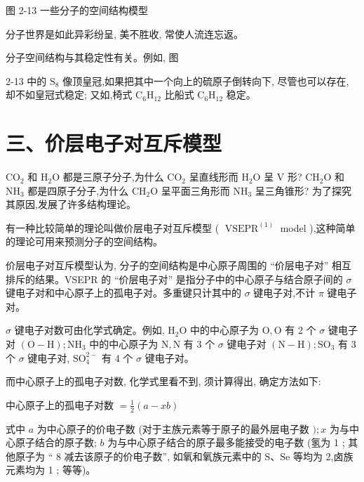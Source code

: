 \documentclass[10pt]{article}
\begin{document}
图 2-13 一些分子的空间结构模型

分子世界是如此异彩纷呈, 美不胜收, 常使人流连忘返。

分子空间结构与其稳定性有关。例如, 图

2-13 中的 \({\mathrm{S}}_{8}\) 像顶皇冠,如果把其中一个向上的硫原子倒转向下, 尽管也可以存在, 却不如皇冠式稳定; 又如,椅式 \({\mathrm{C}}_{6}{\mathrm{H}}_{12}\) 比船式 \({\mathrm{C}}_{6}{\mathrm{H}}_{12}\) 稳定。

\section*{三、价层电子对互斥模型}

\({\mathrm{{CO}}}_{2}\) 和 \({\mathrm{H}}_{2}\mathrm{O}\) 都是三原子分子,为什么 \({\mathrm{{CO}}}_{2}\) 呈直线形而 \({\mathrm{H}}_{2}\mathrm{O}\) 呈 \(\mathrm{V}\) 形? \({\mathrm{{CH}}}_{2}\mathrm{O}\) 和 \({\mathrm{{NH}}}_{3}\) 都是四原子分子,为什么 \({\mathrm{{CH}}}_{2}\mathrm{O}\) 呈平面三角形而 \({\mathrm{{NH}}}_{3}\) 呈三角锥形? 为了探究其原因,发展了许多结构理论。

有一种比较简单的理论叫做价层电子对互斥模型 ( \({\operatorname{VSEPR}}^{\left( 1\right) }\) model ),这种简单的理论可用来预测分子的空间结构。

价层电子对互斥模型认为, 分子的空间结构是中心原子周围的 “价层电子对” 相互排斥的结果。VSEPR 的 “价层电子对” 是指分子中的中心原子与结合原子间的 \(\sigma\) 键电子对和中心原子上的孤电子对。多重键只计其中的 \(\sigma\) 键电子对,不计 \(\pi\) 键电子对。


\(\sigma\) 键电子对数可由化学式确定。例如, \({\mathrm{H}}_{2}\mathrm{O}\) 中的中心原子为 \(\mathrm{O},\mathrm{O}\) 有 2 个 \(\sigma\) 键电子对 \(\left( {\mathrm{O} - \mathrm{H}}\right) ;{\mathrm{{NH}}}_{3}\) 中的中心原子为 \(\mathrm{N},\mathrm{N}\) 有 3 个 \(\sigma\) 键电子对 \(\left( {\mathrm{N} - \mathrm{H}}\right) ;{\mathrm{{SO}}}_{3}\) 有 3 个 \(\sigma\) 键电子对, \({\mathrm{{SO}}}_{4}^{2 - }\) 有 4 个 \(\sigma\) 键电子对。

而中心原子上的孤电子对数, 化学式里看不到, 须计算得出, 确定方法如下:

中心原子上的孤电子对数 \(= \frac{1}{2}\left( {a - {xb}}\right)\)

式中 \(a\) 为中心原子的价电子数 (对于主族元素等于原子的最外层电子数 \();x\) 为与中心原子结合的原子数; \(b\) 为与中心原子结合的原子最多能接受的电子数 (氢为 1 ; 其他原子为 “ 8 减去该原子的价电子数”, 如氧和氧族元素中的 \(\mathrm{S}\text{、}\mathrm{{Se}}\) 等均为 2,卤族元素均为 1 ; 等等)。
\end{document}
